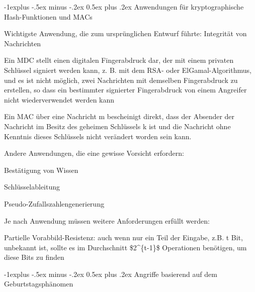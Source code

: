 \documentclass[a4paper]{article}
\makeatletter
\renewcommand{\subsection}{\@startsection{subsection}{2}{0mm}%
 {-1explus -.5ex minus -.2ex}%
 {0.5ex plus .2ex}%
 {\normalfont\normalsize\bfseries}}
\makeatother
\begin{document}
\begin{multicols}{3}
      \subsection{Anwendungen für kryptographische Hash-Funktionen und
            MACs}

      \begin{itemize*}
            \item Wichtigste Anwendung, die zum ursprünglichen Entwurf führte:
            Integrität von Nachrichten
            \begin{itemize*}
                  \item Ein MDC stellt einen digitalen Fingerabdruck dar, der mit einem privaten Schlüssel signiert werden kann, z. B. mit dem RSA- oder ElGamal-Algorithmus, und es ist nicht möglich, zwei Nachrichten mit demselben Fingerabdruck zu erstellen, so dass ein bestimmter signierter Fingerabdruck von einem Angreifer nicht wiederverwendet werden kann
                  \item Ein MAC über eine Nachricht m bescheinigt direkt, dass der Absender der Nachricht im Besitz des geheimen Schlüssels k ist und die Nachricht ohne Kenntnis dieses Schlüssels nicht verändert worden sein kann.
            \end{itemize*}
            \item Andere Anwendungen, die eine gewisse Vorsicht erfordern:
            \begin{itemize*}
                  \item Bestätigung von Wissen
                  \item Schlüsselableitung
                  \item Pseudo-Zufallszahlengenerierung
            \end{itemize*}
            \item Je nach Anwendung müssen weitere Anforderungen erfüllt werden:
            \begin{itemize*}
                  \item Partielle Vorabbild-Resistenz: auch wenn nur ein Teil der Eingabe, z.B. t Bit, unbekannt ist, sollte es im Durchschnitt \$2\^{}\{t-1\}\$ Operationen benötigen, um diese Bits zu finden
            \end{itemize*}
      \end{itemize*}


      \subsection{Angriffe basierend auf dem
            Geburtstagsphänomen}


\end{multicols}
\end{document}
